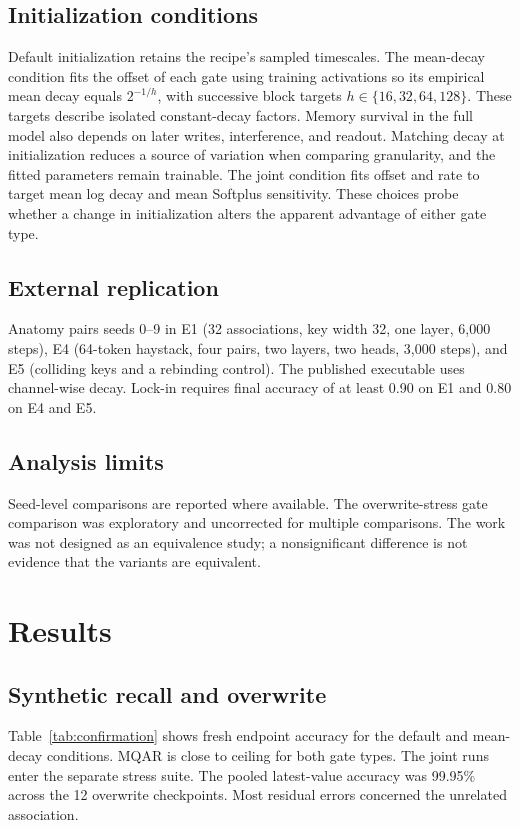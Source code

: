 \documentclass[conference]{IEEEtran}
\begin{document}
\subsection{Initialization conditions}
Default initialization retains the recipe's sampled timescales. The mean-decay condition fits the offset of each gate using training activations so its empirical mean decay equals $2^{-1/h}$, with successive block targets $h \in \{16,32,64,128\}$. These targets describe isolated constant-decay factors. Memory survival in the full model also depends on later writes, interference, and readout. Matching decay at initialization reduces a source of variation when comparing granularity, and the fitted parameters remain trainable. The joint condition fits offset and rate to target mean log decay and mean Softplus sensitivity. These choices probe whether a change in initialization alters the apparent advantage of either gate type.

\subsection{External replication}
Anatomy pairs seeds 0--9 in E1 (32 associations, key width 32, one layer, 6,000 steps), E4 (64-token haystack, four pairs, two layers, two heads, 3,000 steps), and E5 (colliding keys and a rebinding control). The published executable uses channel-wise decay. Lock-in requires final accuracy of at least 0.90 on E1 and 0.80 on E4 and E5.

\subsection{Analysis limits}
Seed-level comparisons are reported where available. The overwrite-stress gate comparison was exploratory and uncorrected for multiple comparisons. The work was not designed as an equivalence study; a nonsignificant difference is not evidence that the variants are equivalent.

\section{Results}
\subsection{Synthetic recall and overwrite}
Table~\ref{tab:confirmation} shows fresh endpoint accuracy for the default and mean-decay conditions. MQAR is close to ceiling for both gate types. The joint runs enter the separate stress suite. The pooled latest-value accuracy was 99.95\% across the 12 overwrite checkpoints. Most residual errors concerned the unrelated association.
\end{document}
